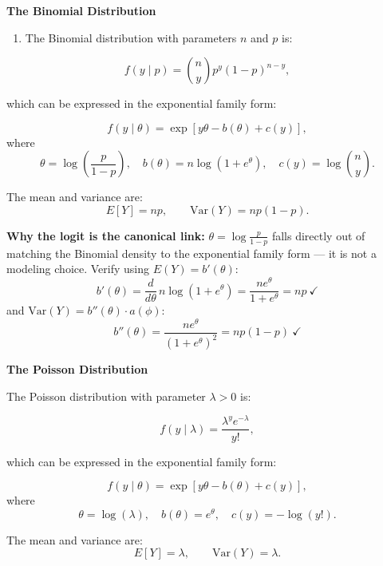 \documentclass[
  letterpaper,
  DIV=11,
  numbers=noendperiod]{scrreprt}
\providecommand{\tightlist}{%
  \setlength{\itemsep}{0pt}\setlength{\parskip}{0pt}}\usepackage{longtable,booktabs,array}
\begin{document}
\begin{tcolorbox}[enhanced jigsaw, rightrule=.15mm, breakable, left=2mm, colframe=quarto-callout-tip-color-frame, opacityback=0, leftrule=.75mm, toprule=.15mm, colback=white, arc=.35mm, bottomrule=.15mm]

\textbf{The Binomial Distribution}\vspace{2mm}

\begin{enumerate}
\def\labelenumi{\arabic{enumi}.}
\tightlist
\item
  The Binomial distribution with parameters \(n\) and \(p\) is:
\end{enumerate}

\[f(y \mid p) = \binom{n}{y} p^y (1-p)^{n-y},\]

which can be expressed in the exponential family form:

\[f(y \mid \theta) = \exp \left[ y \theta - b(\theta) + c(y) \right], \]
where
\[\theta = \log \left( \frac{p}{1-p} \right), \quad b(\theta) = n \log (1 + e^{\theta}), \quad c(y) = \log \binom{n}{y}. \]

The mean and variance are:
\[ E[Y] = np, \qquad \text{Var}(Y) = np(1-p). \]

\textbf{Why the logit is the canonical link:}
\(\theta = \log\!\frac{p}{1-p}\) falls directly out of matching the
Binomial density to the exponential family form --- it is not a modeling
choice. Verify using \(E(Y) = b'(\theta)\): \[
b'(\theta) = \frac{d}{d\theta}\, n\log(1+e^\theta) = \frac{ne^\theta}{1+e^\theta} = np \ \checkmark
\] and \(\text{Var}(Y) = b''(\theta) \cdot a(\phi)\): \[
b''(\theta) = \frac{ne^\theta}{(1+e^\theta)^2} = np(1-p) \ \checkmark
\]

\end{tcolorbox}

\begin{tcolorbox}[enhanced jigsaw, rightrule=.15mm, breakable, left=2mm, colframe=quarto-callout-tip-color-frame, opacityback=0, leftrule=.75mm, toprule=.15mm, colback=white, arc=.35mm, bottomrule=.15mm]

\textbf{The Poisson Distribution}\vspace{2mm}

The Poisson distribution with parameter \(\lambda > 0\) is:

\[f(y \mid \lambda) = \frac{\lambda^y e^{-\lambda}}{y!}, \]

which can be expressed in the exponential family form:

\[f(y \mid \theta) = \exp \left[ y \theta - b(\theta) + c(y) \right], \]
where
\[\theta = \log (\lambda), \quad b(\theta) = e^{\theta}, \quad c(y) = - \log (y!). \]

The mean and variance are:
\[E[Y] = \lambda, \qquad \text{Var}(Y) = \lambda. \]

\end{tcolorbox}
\end{document}
